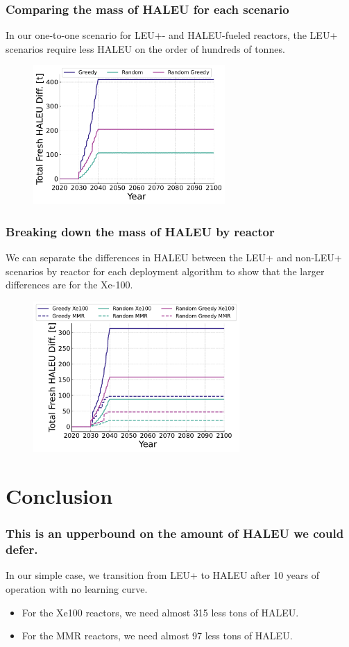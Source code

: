 \documentclass[9pt]{beamer}
\begin{document}
  \begin{frame}
    \frametitle{Comparing the mass of HALEU for each scenario}
    In our one-to-one scenario for LEU+- and HALEU-fueled reactors, the LEU+ scenarios require less HALEU on the order of hundreds of tonnes.
    \begin{figure}
        \centering
        \includegraphics[width=0.65\textwidth]{../images/diff_scheme.pdf}
    \end{figure}
  \end{frame}

  \begin{frame}
    \frametitle{Breaking down the mass of HALEU by reactor}
    We can separate the differences in HALEU between the LEU+ and non-LEU+ scenarios by reactor for each deployment algorithm to show that the larger differences are for the Xe-100.
    \begin{figure}
      \centering
      \includegraphics[width=0.7\textwidth]{../images/diff_reactor_fuel.pdf}
    \end{figure}
  \end{frame}


  \section{Conclusion}
  \begin{frame}
      \frametitle{This is an upperbound on the amount of HALEU we could defer.}
      In our simple case, we transition from LEU+ to HALEU after 10 years of operation with no learning curve.
      \begin{itemize}
          \item For the Xe100 reactors, we need almost 315 less tons of HALEU.
          \item For the MMR reactors, we need almost 97 less tons of HALEU.
      \end{itemize}
  \end{frame}
\end{document}
